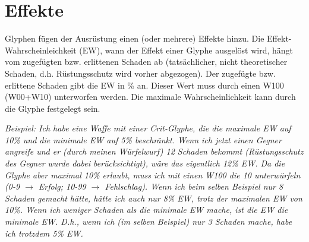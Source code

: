 \section{Effekte}
Glyphen fügen der Ausrüstung einen (oder mehrere) Effekte hinzu. Die Effekt-Wahrscheinleichkeit (EW), wann der Effekt einer Glyphe ausgelöst wird, hängt vom zugefügten bzw. erlittenen Schaden ab (tatsächlicher, nicht theoretischer Schaden, d.h. Rüstungsschutz wird vorher abgezogen). Der zugefügte bzw. erlittene Schaden gibt die EW in \% an. Dieser Wert muss durch einen W100 (W00+W10) unterworfen werden. Die maximale Wahrscheinlichkeit kann durch die Glyphe festgelegt sein. 

\textit{Beispiel: Ich habe eine Waffe mit einer Crit-Glyphe, die die maximale EW auf 10\% und die minimale EW auf 5\% beschränkt. Wenn ich jetzt einen Gegner angreife und er (durch meinen Würfelwurf) 12 Schaden bekommt (Rüstungsschutz des Gegner wurde dabei berücksichtigt), wäre das eigentlich 12\% EW. Da die Glyphe aber maximal 10\% erlaubt, muss ich mit einen W100 die 10 unterwürfeln (0-9 $\rightarrow$ Erfolg; 10-99 $\rightarrow$ Fehlschlag). Wenn ich beim selben Beispiel nur 8 Schaden gemacht hätte, hätte ich auch nur 8\% EW, trotz der maximalen EW von 10\%. Wenn ich weniger Schaden als die minimale EW mache, ist die EW die minimale EW. D.h., wenn ich (im selben Beispiel) nur 3 Schaden mache, habe ich trotzdem 5\% EW.}

